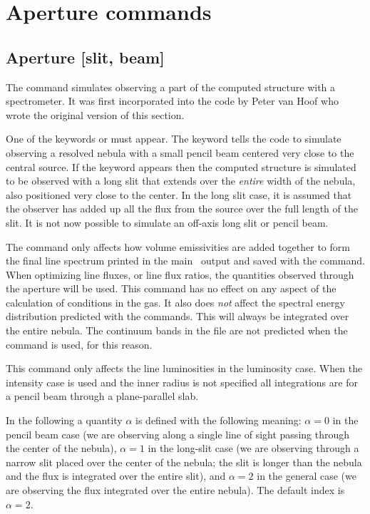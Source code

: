 \section{Aperture commands}

\subsection{Aperture [slit, beam]}

The  command simulates observing
a part of the computed structure
with a spectrometer.
It was first incorporated into the code by Peter van
Hoof who wrote the original version of this section.

One of the keywords  or  must appear.
The keyword  tells
the code to simulate observing a resolved nebula with a
small pencil beam centered very close to the central source.
If the keyword  appears then the computed structure
is simulated to be observed with a long slit that extends
over the {\em entire} width of the nebula, also positioned
very close to the center. In the long slit case, it is assumed
that the observer has added up all the flux from the source over the
full length of the slit. It is not now possible to simulate
an off-axis long slit or pencil beam.

The  command only affects how volume
emissivities are added
together to form the final line spectrum printed in the main \Cloudy\
output and saved with the  command.
When optimizing line fluxes, or line flux ratios, the quantities
observed through the aperture will be used.
This command has no effect on any aspect of
the calculation of conditions in the gas.
It also does {\em not} affect the spectral energy distribution
predicted with the  commands.
This will always be integrated over the entire nebula.
The continuum bands in the file  are not
predicted when the \cdCommand{aperture} command is used, for this reason.

This command only affects the line luminosities in the luminosity case.
When the intensity case is used and the inner radius
is not specified all integrations are for a pencil beam through a plane-parallel slab.

In the following a quantity $\alpha$ is defined
with the following meaning:
$\alpha = 0$ in the pencil beam case
(we are observing along a single line of sight
passing through the center of the nebula),
$\alpha = 1$ in the long-slit case (we
are observing through a narrow slit placed over the center of the nebula;
the slit is longer than the nebula and the
flux is integrated over the entire
slit), and $\alpha = 2$ in the general case
(we are observing the flux integrated
over the entire nebula).
The default index is $\alpha = 2$.


